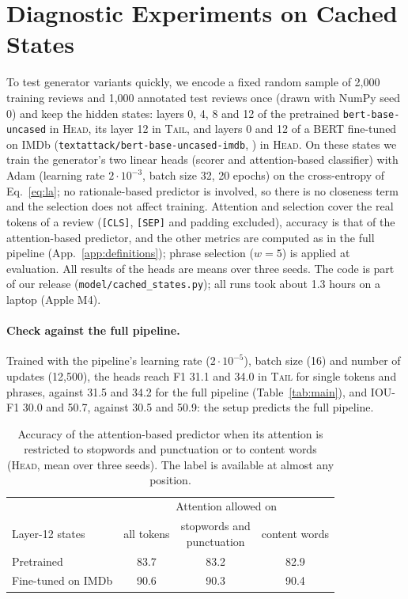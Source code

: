\documentclass[11pt]{article}
\newcommand{\HEAD}{\textup{\textsc{Head}}}
\newcommand{\TAIL}{\textup{\textsc{Tail}}}
\begin{document}
\section{Diagnostic Experiments on Cached States}
\label{app:diagnostics}

To test generator variants quickly, we encode a fixed random sample of 2,000 training reviews and 1,000 annotated test reviews once (drawn with NumPy seed 0) and keep the hidden states: layers 0, 4, 8 and 12 of the pretrained \texttt{bert-base-uncased} in \HEAD, its layer 12 in \TAIL, and layers 0 and 12 of a BERT fine-tuned on IMDb (\texttt{textattack/bert-base-uncased-imdb}, \citealp{morris-etal-2020-textattack}) in \HEAD. On these states we train the generator's two linear heads (scorer and attention-based classifier) with Adam (learning rate $2 \cdot 10^{-3}$, batch size 32, 20 epochs) on the cross-entropy of Eq.~\ref{eq:la}; no rationale-based predictor is involved, so there is no closeness term and the selection does not affect training. Attention and selection cover the real tokens of a review (\texttt{[CLS]}, \texttt{[SEP]} and padding excluded), accuracy is that of the attention-based predictor, and the other metrics are computed as in the full pipeline (App.~\ref{app:definitions}); phrase selection ($w = 5$) is applied at evaluation. All results of the heads are means over three seeds. The code is part of our release (\texttt{model/cached\_states.py}); all runs took about 1.3 hours on a laptop (Apple M4).

\paragraph{Check against the full pipeline.}
Trained with the pipeline's learning rate ($2 \cdot 10^{-5}$), batch size (16) and number of updates (12,500), the heads reach F1 31.1 and 34.0 in \TAIL{} for single tokens and phrases, against 31.5 and 34.2 for the full pipeline (Table~\ref{tab:main}), and IOU-F1 30.0 and 50.7, against 30.5 and 50.9: the setup predicts the full pipeline.

\begin{table}[h]
\centering
\small
\setlength{\tabcolsep}{3.5pt}
\begin{tabular}{@{}lccc@{}}
\toprule
& \multicolumn{3}{c}{Attention allowed on} \\
\cmidrule(l){2-4}
Layer-12 states & all tokens & \shortstack{stopwords and\\punctuation} & content words \\
\midrule
Pretrained & 83.7 & 83.2 & 82.9 \\
Fine-tuned on IMDb & 90.6 & 90.3 & 90.4 \\
\bottomrule
\end{tabular}
\caption{Accuracy of the attention-based predictor when its attention is restricted to stopwords and punctuation or to content words (\HEAD, mean over three seeds). The label is available at almost any position.}
\label{tab:restricted}
\end{table}
\end{document}
